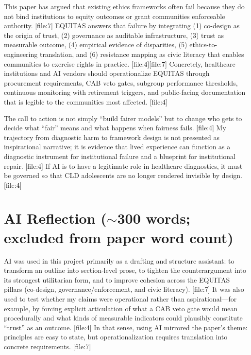 \documentclass[12pt]{article}
\begin{document}
This paper has argued that existing ethics frameworks often fail because they do not bind institutions to equity outcomes or grant communities enforceable authority. [file:7]
EQUITAS answers that failure by integrating (1) co-design as the origin of trust, (2) governance as auditable infrastructure, (3) trust as measurable outcome, (4) empirical evidence of disparities, (5) ethics-to-engineering translation, and (6) resistance mapping as civic literacy that enables communities to exercise rights in practice. [file:4][file:7]
Concretely, healthcare institutions and AI vendors should operationalize EQUITAS through procurement requirements, CAB veto gates, subgroup performance thresholds, continuous monitoring with retirement triggers, and public-facing documentation that is legible to the communities most affected. [file:4]

The call to action is not simply ``build fairer models'' but to change who gets to decide what ``fair'' means and what happens when fairness fails. [file:4]
My trajectory from diagnostic harm to framework design is not presented as inspirational narrative; it is evidence that lived experience can function as a diagnostic instrument for institutional failure and a blueprint for institutional repair. [file:4]
If AI is to have a legitimate role in healthcare diagnostics, it must be governed so that CLD adolescents are no longer rendered invisible by design. [file:4]

\section*{AI Reflection (\texorpdfstring{$\sim$}{\textasciitilde}300 words; excluded from paper word count)}

AI was used in this project primarily as a drafting and structure assistant: to transform an outline into section-level prose, to tighten the counterargument into its strongest utilitarian form, and to improve cohesion across the EQUITAS pillars (co-design, governance/enforcement, and civic literacy). [file:7]
It was also used to test whether my claims were operational rather than aspirational---for example, by forcing explicit articulation of what a CAB veto gate would mean procedurally and what kinds of measurable indicators could plausibly constitute ``trust'' as an outcome. [file:4]
In that sense, using AI mirrored the paper's theme: principles are easy to state, but operationalization requires translation into concrete requirements. [file:7]
\end{document}
